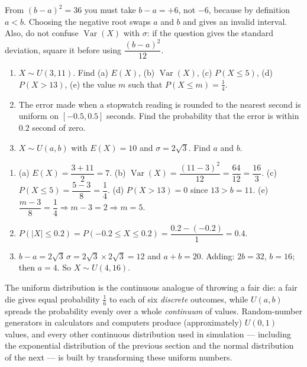 \documentclass[11pt]{article}
\begin{document}
\begin{attention}
From $(b-a)^2=36$ you must take $b-a=+6$, not $-6$, because by definition $a<b$. Choosing the negative root swaps $a$ and $b$ and gives an invalid interval. Also, do not confuse $\operatorname{Var}(X)$ with $\sigma$: if the question gives the standard deviation, square it before using $\dfrac{(b-a)^2}{12}$.
\end{attention}

\begin{exercice}[Practice]
\begin{enumerate}
\item $X\sim U(3,11)$. Find (a) $E(X)$, (b) $\operatorname{Var}(X)$, (c) $P(X\le 5)$, (d) $P(X>13)$, (e) the value $m$ such that $P(X\le m)=\tfrac14$.
\item The error made when a stopwatch reading is rounded to the nearest second is uniform on $[-0.5,0.5]$ seconds. Find the probability that the error is within $0.2$ second of zero.
\item $X\sim U(a,b)$ with $E(X)=10$ and $\sigma=2\sqrt{3}$. Find $a$ and $b$.
\end{enumerate}
\end{exercice}

\begin{corrige}[Exercise 1]
\begin{enumerate}
\item (a) $E(X)=\dfrac{3+11}{2}=7$. (b) $\operatorname{Var}(X)=\dfrac{(11-3)^2}{12}=\dfrac{64}{12}=\dfrac{16}{3}$. (c) $P(X\le 5)=\dfrac{5-3}{8}=\dfrac14$. (d) $P(X>13)=0$ since $13>b=11$. (e) $\dfrac{m-3}{8}=\dfrac14\Rightarrow m-3=2\Rightarrow m=5$.
\item $P(|X|\le 0.2)=P(-0.2\le X\le 0.2)=\dfrac{0.2-(-0.2)}{1}=0.4$.
\item $b-a=2\sqrt{3}\,\sigma=2\sqrt{3}\times 2\sqrt{3}=12$ and $a+b=20$. Adding: $2b=32$, $b=16$; then $a=4$. So $X\sim U(4,16)$.
\end{enumerate}
\end{corrige}

\begin{savaistu}
The uniform distribution is the continuous analogue of throwing a fair die: a fair die gives equal probability $\tfrac16$ to each of six \emph{discrete} outcomes, while $U(a,b)$ spreads the probability evenly over a whole \emph{continuum} of values. Random-number generators in calculators and computers produce (approximately) $U(0,1)$ values, and every other continuous distribution used in simulation --- including the exponential distribution of the previous section and the normal distribution of the next --- is built by transforming these uniform numbers.
\end{savaistu}
\end{document}
